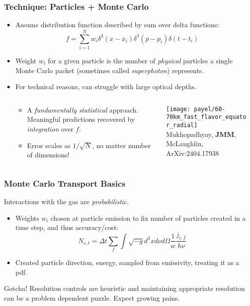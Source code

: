 \documentclass[]{beamer}
\begin{document}
\begin{frame}
  \frametitle{Technique: Particles + Monte Carlo}
  \begin{itemize}
  \item Assume distribution function described by sum over delta functions:
    $$f = \sum_{i=1}^N w_i \delta^3(x - x_i) \delta^3(p - p_i) \delta(t - t_i)$$
  \item Weight $w_i$ for a given particle is the number of
    \textit{physical} particles a single Monte Carlo packet (sometimes
    called \textit{superphoton}) represents.
  \item For technical reasons, can struggle with large optical depths.
    \begin{columns}
      \begin{column}{6.5cm}
        \vspace{-2cm}
        \begin{itemize}
        \item A \textit{fundamentally statistical} approach. Meaningful
          predictions recovered by \textit{integration} over $f$.
        \item Error scales as $1/\sqrt{N}$, no matter number of dimensions!
        \end{itemize}
      \end{column}
      \begin{column}{5.5cm}
        \begin{center}
          \texttt{[image: payel/60-70km\_fast\_flavor\_equator\_radial]}\\
          {\tiny Mukhopadhyay, \textbf{JMM}, McLaughlin, ArXiv:2404.17938}
        \end{center}
      \end{column}
    \end{columns}
\end{itemize}
\end{frame}

\begin{frame}
  \frametitle{Monte Carlo Transport Basics}
  Interactions with the gas are \textit{probabilistic.}
  \begin{itemize}
  \item Weights $w_i$ chosen at particle emission to fix number of particles
    created in a time step, and thus accuracy/cost:
    $$N_{s,t} = \Delta t \sum_f \int \sqrt{-g}d^3 x d\nu d\Omega \frac{1}{w} \frac{j_{\epsilon,f}}{h\nu}$$
  \item Created particle direction, energy, sampled from emissivity, treating it as a pdf.
  \end{itemize}
  \begin{block}{Gotcha!}
    Resolution controls are heuristic and maintaining appropriate
    resolution can be a problem dependent puzzle. Expect growing
    pains.
  \end{block}
\end{frame}
\end{document}

